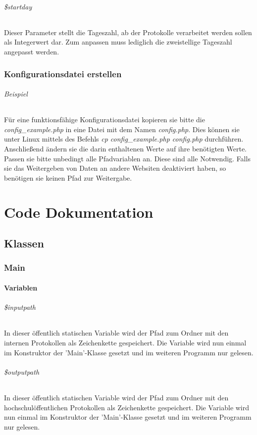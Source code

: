 \documentclass[12pt,parskip=full, pagea4]{scrreprt}
\begin{document}
	\paragraph{\$startday} Dieser Parameter stellt die Tageszahl, ab der Protokolle verarbeitet werden sollen als Integerwert dar. Zum anpassen muss lediglich die zweistellige Tageszahl angepasst werden.
	
	\section{Konfigurationsdatei erstellen}
	\paragraph{Beispiel} Für eine funktionsfähige Konfigurationsdatei kopieren sie bitte die \textit{config\_example.php} in eine Datei mit dem Namen \textit{config.php}. Dies können sie unter Linux mittels des Befehls \textit{cp config\_example.php config.php} durchführen. Anschließend ändern sie die darin enthaltenen Werte auf ihre benötigten Werte. Passen sie bitte unbedingt alle Pfadvariablen an. Diese sind alle Notwendig. Falls sie das Weitergeben von Daten an andere Websiten deaktiviert haben, so benötigen sie keinen Pfad zur Weitergabe. 
	
	\part{Code Dokumentation}
	\chapter{Klassen}
	\section{Main}
	\subsection{Variablen}
	
	\paragraph{\$inputpath} In dieser öffentlich statischen Variable wird der Pfad zum Ordner mit den internen Protokollen als Zeichenkette gespeichert. Die Variable wird nun einmal im Konstruktor der 'Main'-Klasse gesetzt und im weiteren Programm nur gelesen.
	
	\paragraph{\$outputpath} In dieser öffentlich statischen Variable wird der Pfad zum Ordner mit den hochschulöffentlichen Protokollen als Zeichenkette gespeichert. Die Variable wird nun einmal im Konstruktor der 'Main'-Klasse gesetzt und im weiteren Programm nur gelesen.
	
\end{document}
